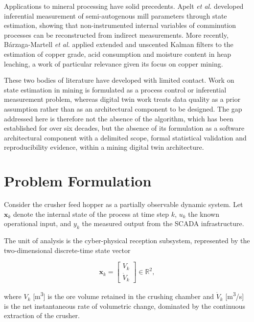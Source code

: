 \documentclass[conference]{IEEEtran}
\begin{document}
Applications to mineral processing have solid precedents. Apelt \textit{et al.}
\cite{apelt2002} developed inferential measurement of semi-autogenous mill
parameters through state estimation, showing that non-instrumented internal
variables of comminution processes can be reconstructed from indirect
measurements. More recently, B\'arzaga-Martell \textit{et al.}
\cite{barzaga2025} applied extended and unscented Kalman filters to the
estimation of copper grade, acid consumption and moisture content in heap
leaching, a work of particular relevance given its focus on copper mining.

These two bodies of literature have developed with limited contact. Work on
state estimation in mining is formulated as a process control or inferential
measurement problem, whereas digital twin work treats data quality as a prior
assumption rather than as an architectural component to be designed. The gap
addressed here is therefore not the absence of the algorithm, which has been
established for over six decades, but the absence of its formulation as a
software architectural component with a delimited scope, formal statistical
validation and reproducibility evidence, within a mining digital twin
architecture.

\section{Problem Formulation}
\label{sec:problem}

Consider the crusher feed hopper as a partially observable dynamic system. Let
$\mathbf{x}_k$ denote the internal state of the process at time step $k$,
$u_k$ the known operational input, and $y_k$ the measured output from the SCADA
infrastructure.

The unit of analysis is the cyber-physical reception subsystem, represented by
the two-dimensional discrete-time state vector

\begin{equation}
\mathbf{x}_{k} = \begin{bmatrix} V_{k} \\ \dot{V}_{k} \end{bmatrix}
\in \mathbb{R}^{2},
\label{eq:state}
\end{equation}

where $V_{k}$ [m\textsuperscript{3}] is the ore volume retained in the crushing
chamber and $\dot{V}_{k}$ [m\textsuperscript{3}/s] is the net instantaneous rate
of volumetric change, dominated by the continuous extraction of the crusher.
\end{document}
